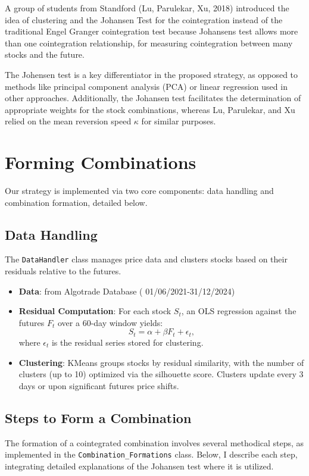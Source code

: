 \documentclass[a4paper,12pt]{article}
\begin{document}
A group of students from Standford (Lu, Parulekar, Xu, 2018) introduced the idea of clustering and the Johansen Test for the cointegration instead of the traditional Engel Granger cointegration test because Johansens test allows more than one cointegration relationship, for measuring cointegration between many stocks and the future. 

The Johensen test is a key differentiator in the proposed strategy, as opposed to methods like principal component analysis (PCA) or linear regression used in other approaches. Additionally, the Johansen test facilitates the determination of appropriate weights for the stock combinations, whereas Lu, Parulekar, and Xu relied on the mean reversion speed \( \kappa \) for similar purposes.

\section{Forming Combinations}
Our strategy is implemented via two core components: data handling and combination formation, detailed below.

\subsection{Data Handling}
The \texttt{DataHandler} class manages price data and clusters stocks based on their residuals relative to the futures.
\begin{itemize}
    \item \textbf{Data}: from Algotrade Database ( 01/06/2021-31/12/2024) 
    \item \textbf{Residual Computation}: For each stock \( S_t \), an OLS regression against the futures \( F_t \) over a 60-day window yields:
    \[
    S_t = \alpha + \beta F_t + \epsilon_t,
    \]
    where \( \epsilon_t \) is the residual series stored for clustering.
    \item \textbf{Clustering}: KMeans groups stocks by residual similarity, with the number of clusters (up to 10) optimized via the silhouette score. Clusters update every 3 days or upon significant futures price shifts.
\end{itemize}


\subsection{Steps to Form a Combination}
The formation of a cointegrated combination involves several methodical steps, as implemented in the \texttt{Combination\_Formations} class. Below, I describe each step, integrating detailed explanations of the Johansen test where it is utilized.
\end{document}
